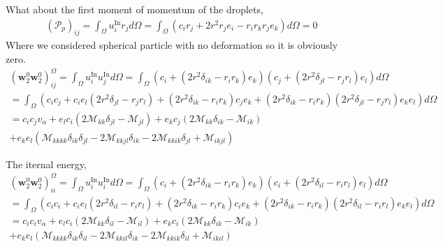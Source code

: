 What about the first moment of momentum of the droplets, 
\begin{align*}
    (\mathcal{P}_p)_{ij}
    = \int_{\Omega} 
    u_i^\text{In} r_j 
    d\Omega
    = \int_{\Omega} 
    (c_i r_j 
    + 2 r^2  r_j e_i - r_i r_k r_j e_k)
    d\Omega
    = 0 
\end{align*}
Where we considered spherical particle with no deformation so it is obviously zero.
\begin{align*}
    (\textbf{w}_2^0 \textbf{w}_2^0)_{ij}^\Omega
    = \int_{\Omega} 
    u_i^\text{In}u_j^\text{In}
    d\Omega
    = \int_{\Omega} 
    ( c_i + \left(2 r^2 \delta_{ik} - r_ir_k\right) e_k)
    ( c_j + \left(2 r^2 \delta_{jl} - r_jr_l\right) e_l)
    d\Omega\\
    = \int_{\Omega} 
    (c_i c_j + c_i e_l (2 r^2 \delta_{jl} - r_jr_l )
    + (2 r^2 \delta_{ik} - r_ir_k)c_j e_k
    +  (2 r^2 \delta_{ik} - r_ir_k)(2 r^2 \delta_{jl} - r_jr_l)e_ke_l
    )
    d\Omega\\
    = c_i c_j v_\alpha
    + e_l c_i (2 \mathcal{M}_{kk} \delta_{jl} - \mathcal{M}_{jl})
    + e_k c_j (2 \mathcal{M}_{kk} \delta_{ik} - \mathcal{M}_{ik})\\
    + e_ke_l (\mathcal{M}_{kkkk}\delta_{ik}\delta_{jl}
    -2\mathcal{M}_{kkjl}\delta_{ik}
    -2\mathcal{M}_{kkik}\delta_{jl}
    + \mathcal{M}_{ikjl}) 
\end{align*}

The iternal energy, 
\begin{align*}
    (\textbf{w}_2^0 \textbf{w}_2^0)_{ii}^\Omega
    = \int_{\Omega} 
    u_i^\text{In}u_i^\text{In}
    d\Omega
    = \int_{\Omega} 
    ( c_i + \left(2 r^2 \delta_{ik} - r_ir_k\right) e_k)
    ( c_i + \left(2 r^2 \delta_{il} - r_ir_l\right) e_l)
    d\Omega\\
    = \int_{\Omega} 
    (c_i c_i + c_i e_l (2 r^2 \delta_{il} - r_ir_l )
    + (2 r^2 \delta_{ik} - r_ir_k)c_i e_k
    +  (2 r^2 \delta_{ik} - r_ir_k)(2 r^2 \delta_{il} - r_ir_l)e_ke_l
    )
    d\Omega\\
    = c_i c_i v_\alpha
    + e_l c_i (2 \mathcal{M}_{kk} \delta_{il} - \mathcal{M}_{il})
    + e_k c_i (2 \mathcal{M}_{kk} \delta_{ik} - \mathcal{M}_{ik})\\
    + e_ke_l (\mathcal{M}_{kkkk}\delta_{ik}\delta_{il}
    -2\mathcal{M}_{kkil}\delta_{ik}
    -2\mathcal{M}_{kkik}\delta_{il}
    + \mathcal{M}_{ikil}) 
\end{align*}


